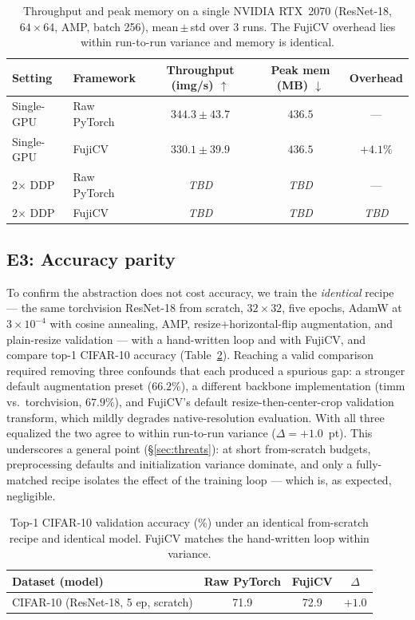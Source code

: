 \documentclass[11pt]{article}
\begin{document}
\begin{table}[h]
\centering
\caption{Throughput and peak memory on a single NVIDIA RTX~2070 (ResNet-18,
$64{\times}64$, AMP, batch 256), mean\,$\pm$\,std over 3 runs. The FujiCV overhead
lies within run-to-run variance and memory is identical.}
\label{tab:throughput}
\small
\begin{tabular}{llccc}
\toprule
Setting & Framework & Throughput (img/s) $\uparrow$ & Peak mem (MB) $\downarrow$ & Overhead \\
\midrule
Single-GPU & Raw PyTorch & $344.3 \pm 43.7$ & $436.5$ & --- \\
Single-GPU & FujiCV      & $330.1 \pm 39.9$ & $436.5$ & $+4.1\%$ \\
2$\times$ DDP & Raw PyTorch & \textit{TBD} & \textit{TBD} & --- \\
2$\times$ DDP & FujiCV      & \textit{TBD} & \textit{TBD} & \textit{TBD} \\
\bottomrule
\end{tabular}
\end{table}

\subsection{E3: Accuracy parity}
\label{sec:e3}
To confirm the abstraction does not cost accuracy, we train the \emph{identical}
recipe --- the same torchvision ResNet-18 from scratch, $32{\times}32$, five
epochs, AdamW at $3{\times}10^{-4}$ with cosine annealing, AMP, resize+horizontal-flip
augmentation, and plain-resize validation --- with a hand-written loop and with
FujiCV, and compare top-1 CIFAR-10 accuracy (Table~\ref{tab:accuracy}). Reaching a
valid comparison required removing three confounds that each produced a spurious
gap: a stronger default augmentation preset ($66.2\%$), a different backbone
implementation (timm vs.\ torchvision, $67.9\%$), and FujiCV's default
resize-then-center-crop validation transform, which mildly degrades
native-resolution evaluation. With all three equalized the two agree to within
run-to-run variance ($\Delta = +1.0$~pt). This underscores a general point
(\S\ref{sec:threats}): at short from-scratch budgets, preprocessing defaults and
initialization variance dominate, and only a fully-matched recipe isolates the
effect of the training loop --- which is, as expected, negligible.

\begin{table}[h]
\centering
\caption{Top-1 CIFAR-10 validation accuracy (\%) under an identical from-scratch
recipe and identical model. FujiCV matches the hand-written loop within variance.}
\label{tab:accuracy}
\small
\begin{tabular}{lccc}
\toprule
Dataset (model) & Raw PyTorch & FujiCV & $\Delta$ \\
\midrule
CIFAR-10 (ResNet-18, 5 ep, scratch) & 71.9 & 72.9 & $+1.0$ \\
\bottomrule
\end{tabular}
\end{table}
\end{document}
